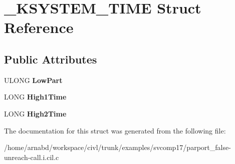 \hypertarget{struct__KSYSTEM__TIME}{}\section{\+\_\+\+K\+S\+Y\+S\+T\+E\+M\+\_\+\+T\+I\+M\+E Struct Reference}
\label{struct__KSYSTEM__TIME}
\subsection*{Public Attributes}
\begin{DoxyCompactItemize}
\item 
\hypertarget{struct__KSYSTEM__TIME_a7e5f6afc567e66eae778e8baca6cef41}{}U\+L\+O\+N\+G {\bfseries Low\+Part}\label{struct__KSYSTEM__TIME_a7e5f6afc567e66eae778e8baca6cef41}

\item 
\hypertarget{struct__KSYSTEM__TIME_a0941b482103748a8e302e352cb42daa2}{}L\+O\+N\+G {\bfseries High1\+Time}\label{struct__KSYSTEM__TIME_a0941b482103748a8e302e352cb42daa2}

\item 
\hypertarget{struct__KSYSTEM__TIME_a251040bf2fd9fcb7e9cbf1f2693cb606}{}L\+O\+N\+G {\bfseries High2\+Time}\label{struct__KSYSTEM__TIME_a251040bf2fd9fcb7e9cbf1f2693cb606}

\end{DoxyCompactItemize}


The documentation for this struct was generated from the following file\+:\begin{DoxyCompactItemize}
\item 
/home/arnabd/workspace/civl/trunk/examples/svcomp17/parport\+\_\+false-\/unreach-\/call.\+i.\+cil.\+c\end{DoxyCompactItemize}
